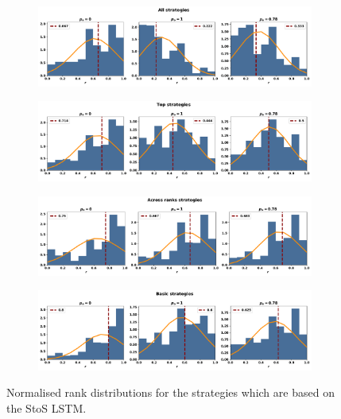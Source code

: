 \begin{figure}[!htbp]
    \begin{subfigure}{\textwidth}
    \includegraphics[width=\textwidth]{src/chapters/07/img/normalised_rank_all_strategies.pdf}
    \end{subfigure}
    \par\bigskip
    \begin{subfigure}{\textwidth}
    \includegraphics[width=\textwidth]{src/chapters/07/img/normalised_rank_top_strategies.pdf}
    \end{subfigure}
    \par\bigskip
    \begin{subfigure}{\textwidth}
    \includegraphics[width=\textwidth]{src/chapters/07/img/normalised_rank_across_ranks_strategies.pdf}
    \end{subfigure}
    \par\bigskip
    \begin{subfigure}{\textwidth}
    \includegraphics[width=\textwidth]{src/chapters/07/img/normalised_rank_basic_strategies.pdf}
    \end{subfigure}
    \caption{Normalised rank distributions for the strategies which are based on the StoS
    LSTM.}\label{fig:normalised_rank_distributions_sequence_to_sequence}
\end{figure}

